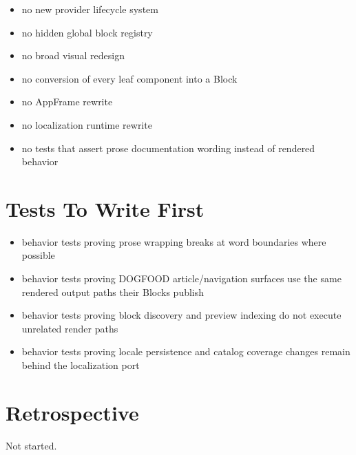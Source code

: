 \begin{itemize}
\tightlist
\item
  no new provider lifecycle system
\item
  no hidden global block registry
\item
  no broad visual redesign
\item
  no conversion of every leaf component into a Block
\item
  no AppFrame rewrite
\item
  no localization runtime rewrite
\item
  no tests that assert prose documentation wording instead of rendered behavior
\end{itemize}

\section{Tests To Write First}\label{record-110-tests-to-write-first}

\begin{itemize}
\tightlist
\item
  behavior tests proving prose wrapping breaks at word boundaries where possible
\item
  behavior tests proving DOGFOOD article/navigation surfaces use the same rendered output paths their Blocks publish
\item
  behavior tests proving block discovery and preview indexing do not execute unrelated render paths
\item
  behavior tests proving locale persistence and catalog coverage changes remain behind the localization port
\end{itemize}

\section{Retrospective}\label{record-110-retrospective}

Not started.

